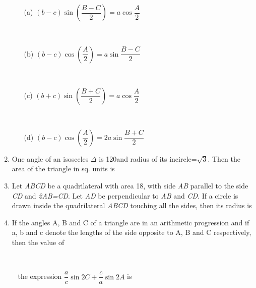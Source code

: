 \documentclass[journal,12pt,twocolumn]{IEEEtran}
\begin{document}
\begin{enumerate}
 \begin{itemize}
 \item[(a)] $\left(b-c\right)\sin\left(\dfrac{B-C}{2}\right)=a\cos\dfrac{A}{2}$
 \item[~]
 \item[(b)] $\left(b-c\right)\cos\left(\dfrac{A}{2}\right)=a\sin\dfrac{B-C}{2}$
 \item[~]
 \item[(c)] $\left(b+c\right)\sin\left(\dfrac{B+C}{2}\right)=a\cos\dfrac{A}{2}$
 \item[~]
 \item[(d)] $\left(b-c\right)\cos\left(\dfrac{A}{2}\right)=2a\sin\dfrac{B+C}{2}$
 \end{itemize}
 \item One angle of an isosceles $\Delta$ is 120\degree and radius of its incircle=$\sqrt{3}$. Then the area of the triangle in sq. units is
 \begin{itemize}
 \end{itemize}
 \item Let \textsl{ABCD} be a quadrilateral with area 18, with side \textsl{AB} parallel to the side \textsl{CD} and \textsl{2AB=CD}. Let \textsl{AD} be perpendicular to \textsl{AB} and \textsl{CD}. If a circle is drawn inside the quadrilateral \textsl{ABCD} touching all the sides, then its radius is
 \begin{itemize}
 \end{itemize}
 \item If the angles A, B and C of a triangle are in an arithmetic progression and if a, b and c denote the lengths of the side opposite to A, B and C respectively, then the value of \item[~] \item[~] the expression $\dfrac{a}{c}\sin2C+\dfrac{c}{a}\sin2A$ is

\end{enumerate}
\end{document}
